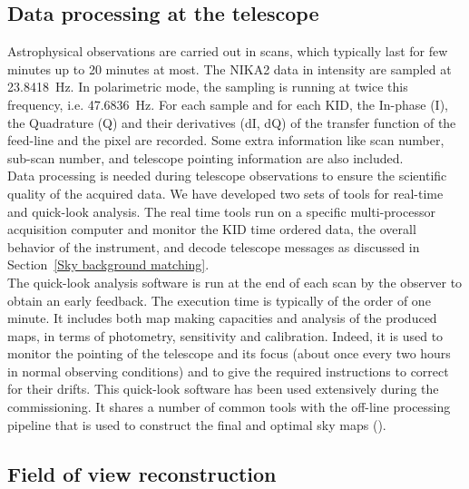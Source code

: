 \documentclass[]{aa} %
\begin{document}
\subsection{Data processing at the telescope}
\label{Data processing at the telescope}

Astrophysical observations are carried out in scans, which typically last for few minutes up to 20 minutes at most.
The NIKA2 data in intensity are sampled at 23.8418~Hz. In polarimetric mode, the sampling is running at twice this frequency, i.e. 47.6836~Hz. For each sample and for each KID, the In-phase (I), the Quadrature (Q) and their derivatives (dI, dQ) of the transfer function of the feed-line and the pixel are recorded. Some extra information like scan number, sub-scan number, and telescope pointing information are also included. \\

Data processing is needed during telescope observations to ensure the scientific quality of the acquired data.
We have developed two sets of tools for real-time and quick-look analysis. The real time tools run on a specific multi-processor acquisition computer and monitor the KID time ordered data, the overall behavior of the instrument, and decode telescope messages as discussed in Section~\ref{Sky background matching}. \\

The quick-look analysis software is run at the end of each scan by the observer to obtain an early feedback. The execution time is typically of the order of one minute. It includes both map making capacities and analysis of the produced maps, in terms of photometry, sensitivity and calibration. Indeed, it is used to monitor the pointing of the telescope and its focus (about once every two hours in normal observing conditions) and to give the required instructions to correct for their drifts. This quick-look software has been used extensively during the commissioning. It shares a number of common tools with the off-line processing pipeline that is used to construct the final and optimal sky maps (\cite{pipeline}).

\subsection{Field of view reconstruction}
\label{Field of view reconstruction}
\end{document}
